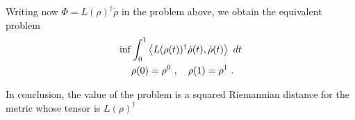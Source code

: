 \documentclass[12pt,a4paper]{amsart}
\begin{document}
Writing now $\Phi = L(\rho)^\dagger \dot \rho$ in the problem above,
we obtain the equivalent problem
\begin{align*}
 \inf &\int_0^1 \left\langle L(\rho(t))^\dagger \dot \rho(t),\dot \rho(t)\right\rangle \ dt
 \\
 &\rho(0) = \rho^0 \ , \quad \rho(1) = \rho^1 \ .
\end{align*}

In conclusion, the value of the problem is a squared Riemannian
distance for the metric whose tensor is $L(\rho)^\dagger$
\end{document}
